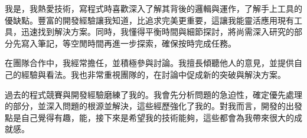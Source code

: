 我是\chineseName ，我熱愛技術，寫程式時喜歡深入了解其背後的邏輯與運作，了解手上工具的優缺點。豐富的開發經驗讓我知道，比追求完美更重要，這讓我能靈活應用現有工具，迅速找到解決方案。同時，我懂得平衡時間與細節探討，將尚需深入研究的部分先寫入筆記，等空閒時間再進一步探索，確保按時完成任務。

在團隊合作中，我經常擔任，並積極參與討論。我擅長傾聽他人的意見，並提供自己的經驗與看法。我也非常重視團隊的，在討論中促成新的突破與解決方案。

過去的程式競賽與開發經驗磨練了我的。我會先分析問題的急迫性，確定優先處理的部分，並深入問題的根源並解決，這些經歷強化了我的。對我而言，開發的出發點是自己覺得有趣，能，接下來是希望我的技術能夠，這些都會為我帶來很大的成就感。
